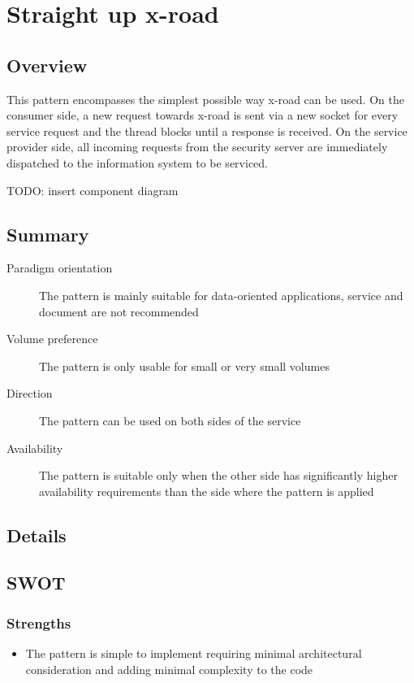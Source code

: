 \documentclass[10pt,a4paper]{article}
\begin{document}
\section{Straight up x-road}
\label{sec:p:1}
\subsection{Overview}
This pattern encompasses the simplest possible way x-road can be used. On the consumer side, a new request towards x-road is sent via a new socket for every service request and the thread blocks until a response is received. On the service provider side, all incoming requests from the security server are immediately dispatched to the information system to be serviced.

TODO: insert component diagram

\subsection{Summary}
\begin{description}
	\item[Paradigm orientation] The pattern is mainly suitable for data-oriented applications, service and document are not recommended
	\item[Volume preference] The pattern is only usable for small or very small volumes
	\item[Direction] The pattern can be used on both sides of the service
	\item[Availability] The pattern is suitable only when the other side has significantly higher availability requirements than the side where the pattern is applied
\end{description}

\subsection{Details}

\subsection{SWOT}
\subsubsection{Strengths}
	\begin{itemize}
		\item The pattern is simple to implement requiring minimal architectural consideration and adding minimal complexity to the code
	\end{itemize}
\end{document}
